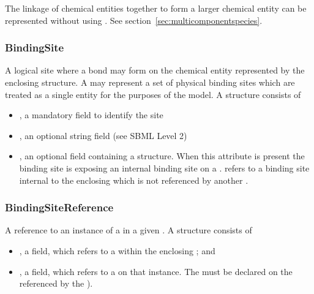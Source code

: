 \documentclass{cekarticle}
\begin{document}
The linkage of chemical entities together to form a larger chemical entity can be 
represented without using .  See section~\ref{sec:multicomponentspecies}.

\subsubsection{BindingSite}

A logical site where a bond may form on the chemical entity represented by the
enclosing  structure.  A  may represent a set of
physical binding sites which are treated as a single entity for the purposes of the model.  
A  structure consists of

\begin{itemize}

\item {}, a mandatory  field to identify the site

\item {}, an optional string field (see SBML Level 2)

\item {}, an optional field containing a
 structure.  When this attribute is present the binding site is
exposing an internal binding site on a .
 refers to a binding site internal to the enclosing
 which is not referenced by another .

\end{itemize}

\subsubsection{BindingSiteReference}

A reference to an instance of a  in a given .
A  structure consists of

\begin{itemize}

\item {}, a  field,
which refers to a  within the enclosing
; and

\item {}, a  field, which refers to a 
on that instance.  The  must be declared on the  referenced by the
).

\end{itemize}
\end{document}
